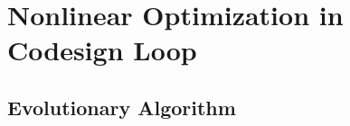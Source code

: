 \chapter{Nonlinear Optimization in Codesign Loop}
\label{chp:05-EvolutionAlgo}

\section{Evolutionary Algorithm}